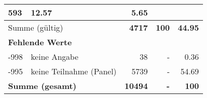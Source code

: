 \begin{longtable}{lXrrr}
       \num{593} &
       \num[round-mode=places,round-precision=2]{12,57} &
         \num[round-mode=places,round-precision=2]{5,65} \\
     \midrule
     \multicolumn{2}{l}{Summe (gültig)} &
       \textbf{\num{4717}} &
     \textbf{100} &
       \textbf{\num[round-mode=places,round-precision=2]{44,95}} \\
     \multicolumn{5}{l}{\textbf{Fehlende Werte}}\\
       -998 &
       keine Angabe &
         \num{38} &
        - &
         \num[round-mode=places,round-precision=2]{0,36} \\
       -995 &
       keine Teilnahme (Panel) &
         \num{5739} &
        - &
         \num[round-mode=places,round-precision=2]{54,69} \\
     \midrule
     \multicolumn{2}{l}{\textbf{Summe (gesamt)}} &
          \textbf{\num{10494}} &
        \textbf{-} &
        \textbf{100} \\
     \bottomrule
     \end{longtable}
     
